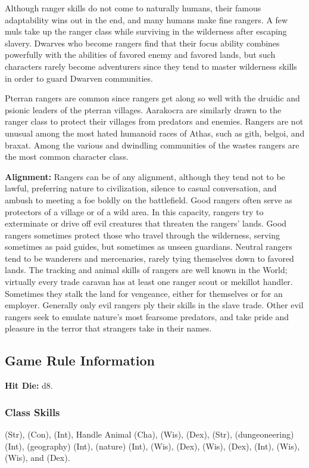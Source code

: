 Although ranger skills do not come to naturally humans, their famous adaptability wins out in the end, and many humans make fine rangers. A few muls take up the ranger class while surviving in the wilderness after escaping slavery. Dwarves who become rangers find that their focus ability combines powerfully with the abilities of favored enemy and favored lands, but such characters rarely become adventurers since they tend to master wilderness skills in order to guard Dwarven communities.

Pterran rangers are common since rangers get along so well with the druidic and psionic leaders of the pterran villages. Aarakocra are similarly drawn to the ranger class to protect their villages from predators and enemies. Rangers are not unusual among the most hated humanoid races of Athas, such as gith, belgoi, and braxat. Among the various and dwindling communities of the wastes rangers are the most common character class.

\textbf{Alignment:} Rangers can be of any alignment, although they tend not to be lawful, preferring nature to civilization, silence to casual conversation, and ambush to meeting a foe boldly on the battlefield. Good rangers often serve as protectors of a village or of a wild area. In this capacity, rangers try to exterminate or drive off evil creatures that threaten the rangers' lands. Good rangers sometimes protect those who travel through the wilderness, serving sometimes as paid guides, but sometimes as unseen guardians. Neutral rangers tend to be wanderers and mercenaries, rarely tying themselves down to favored lands. The tracking and animal skills of rangers are well known in the World; virtually every trade caravan has at least one ranger scout or mekillot handler. Sometimes they stalk the land for vengeance, either for themselves or for an employer. Generally only evil rangers ply their skills in the slave trade. Other evil rangers seek to emulate nature's most fearsome predators, and take pride and pleasure in the terror that strangers take in their names.

\subsection{Game Rule Information}

\textbf{Hit Die:} d8.

\subsubsection{Class Skills}
 (Str),  (Con),  (Int), Handle Animal (Cha),  (Wis),  (Dex),  (Str),  (dungeoneering) (Int),  (geography) (Int),  (nature) (Int),  (Wis),  (Dex),  (Wis),  (Dex),  (Int),  (Wis),  (Wis), and  (Dex).

